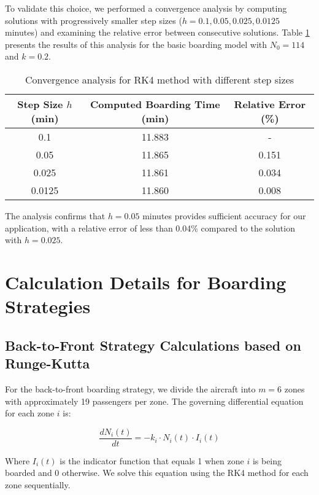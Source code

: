 To validate this choice, we performed a convergence analysis by computing solutions with progressively smaller step sizes ($h = 0.1, 0.05, 0.025, 0.0125$ minutes) and examining the relative error between consecutive solutions. Table \ref{tab:rk4_convergence} presents the results of this analysis for the basic boarding model with $N_0 = 114$ and $k = 0.2$.

\begin{table}[h]
\centering
\begin{tabular}{|c|c|c|}
\hline
\textbf{Step Size $h$ (min)} & \textbf{Computed Boarding Time (min)} & \textbf{Relative Error (\%)} \\
\hline
0.1 & 11.883 & - \\
\hline
0.05 & 11.865 & 0.151 \\
\hline
0.025 & 11.861 & 0.034 \\
\hline
0.0125 & 11.860 & 0.008 \\
\hline
\end{tabular}
\caption{Convergence analysis for RK4 method with different step sizes}
\label{tab:rk4_convergence}
\end{table}

The analysis confirms that $h = 0.05$ minutes provides sufficient accuracy for our application, with a relative error of less than 0.04\% compared to the solution with $h = 0.025$.

\section{Calculation Details for Boarding Strategies}

\subsection{Back-to-Front Strategy Calculations based on Runge-Kutta}

For the back-to-front boarding strategy, we divide the aircraft into $m = 6$ zones with approximately 19 passengers per zone. The governing differential equation for each zone $i$ is:

\begin{equation}
\frac{dN_i(t)}{dt} = -k_i \cdot N_i(t) \cdot I_i(t)
\end{equation}

Where $I_i(t)$ is the indicator function that equals 1 when zone $i$ is being boarded and 0 otherwise. We solve this equation using the RK4 method for each zone sequentially.

